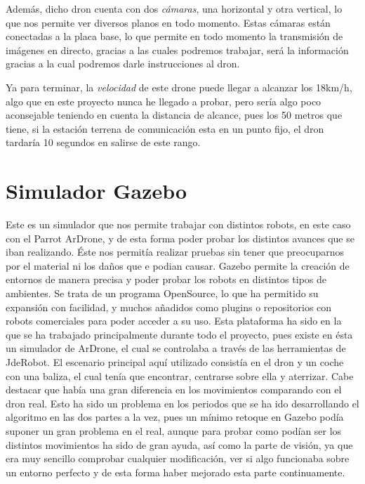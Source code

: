 \hspace{1 cm} Adem\'as, dicho dron cuenta con dos \textsl{c\'amaras}, una horizontal y otra vertical, lo que nos permite ver diversos planos en todo momento. Estas c\'amaras est\'an conectadas a la placa base, lo que permite en todo momento la transmisi\'on de im\'agenes en directo, gracias a las cuales podremos trabajar, ser\'a la informaci\'on gracias a la cual podremos darle instrucciones al dron. %

\hspace{1 cm} Ya para terminar, la \textsl{velocidad} de este drone puede llegar a alcanzar los 18km/h, algo que en este proyecto nunca he llegado a probar, pero ser\'ia algo poco aconsejable teniendo en cuenta la distancia de alcance, pues los 50 metros que tiene, si la estaci\'on terrena de comunicaci\'on esta en un punto fijo, el dron tardar\'ia 10 segundos en salirse de este rango. 


\section{Simulador Gazebo }
\hspace{1 cm} Este es un simulador que nos permite trabajar con distintos robots, en este caso con el Parrot ArDrone, y de esta forma poder probar los distintos avances que se iban realizando. \'Este nos permit\'ia realizar pruebas sin tener que preocuparnos por el material ni los daños que e podian causar. Gazebo permite la creaci\'on de entornos de manera precisa y poder probar los robots en distintos tipos de ambientes. Se trata de un programa OpenSource, lo que ha permitido su expansi\'on con facilidad, y muchos añadidos como plugins o repositorios con robots comerciales para poder acceder a su uso. Esta plataforma ha sido en la que se ha trabajado principalmente durante todo el proyecto, pues existe en \'esta un simulador de ArDrone, el cual se controlaba a trav\'es de las herramientas de JdeRobot. El escenario principal aqu\'i utilizado consist\'ia en el dron y un coche con una baliza, el cual ten\'ia que encontrar, centrarse sobre ella y aterrizar. Cabe destacar que hab\'ia una gran diferencia en los movimientos comparando con el dron real. Esto ha sido un problema en los periodos que se ha ido desarrollando el algoritmo en las dos partes a la vez, pues un m\'inimo retoque en Gazebo pod\'ia suponer un gran problema en el real, aunque para probar como pod\'ian ser los distintos movimientos ha sido de gran ayuda, as\'i como la parte de visi\'on, ya que era muy sencillo comprobar cualquier modificaci\'on, ver si algo funcionaba sobre un entorno perfecto y de esta forma haber mejorado esta parte continuamente.

